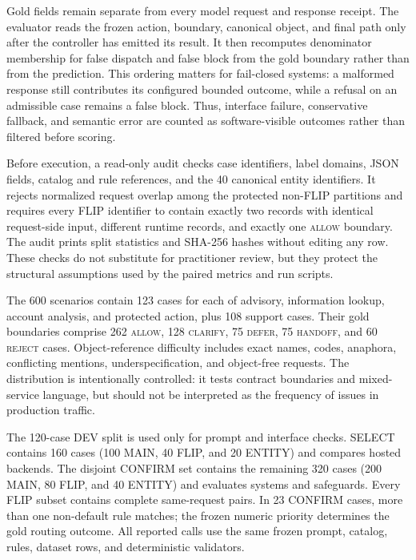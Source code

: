\documentclass[10pt,conference,a4paper]{IEEEtran}
\begin{document}
Gold fields remain separate from every model request and response receipt. The evaluator reads the frozen action, boundary, canonical object, and final path only after the controller has emitted its result. It then recomputes denominator membership for false dispatch and false block from the gold boundary rather than from the prediction. This ordering matters for fail-closed systems: a malformed response still contributes its configured bounded outcome, while a refusal on an admissible case remains a false block. Thus, interface failure, conservative fallback, and semantic error are counted as software-visible outcomes rather than filtered before scoring.

Before execution, a read-only audit checks case identifiers, label domains, JSON fields, catalog and rule references, and the 40 canonical entity identifiers. It rejects normalized request overlap among the protected non-FLIP partitions and requires every FLIP identifier to contain exactly two records with identical request-side input, different runtime records, and exactly one \textsc{allow} boundary. The audit prints split statistics and SHA-256 hashes without editing any row. These checks do not substitute for practitioner review, but they protect the structural assumptions used by the paired metrics and run scripts.

The 600 scenarios contain 123 cases for each of advisory, information lookup, account analysis, and protected action, plus 108 support cases. Their gold boundaries comprise 262 \textsc{allow}, 128 \textsc{clarify}, 75 \textsc{defer}, 75 \textsc{handoff}, and 60 \textsc{reject} cases. Object-reference difficulty includes exact names, codes, anaphora, conflicting mentions, underspecification, and object-free requests. The distribution is intentionally controlled: it tests contract boundaries and mixed-service language, but should not be interpreted as the frequency of issues in production traffic.

The 120-case DEV split is used only for prompt and interface checks. SELECT contains 160 cases (100 MAIN, 40 FLIP, and 20 ENTITY) and compares hosted backends. The disjoint CONFIRM set contains the remaining 320 cases (200 MAIN, 80 FLIP, and 40 ENTITY) and evaluates systems and safeguards. Every FLIP subset contains complete same-request pairs. In 23 CONFIRM cases, more than one non-default rule matches; the frozen numeric priority determines the gold routing outcome. All reported calls use the same frozen prompt, catalog, rules, dataset rows, and deterministic validators.
\end{document}
